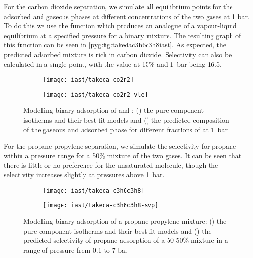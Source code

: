 For the carbon dioxide separation, we simulate all equilibrium 
points for the adsorbed and gaseous phases at different concentrations 
of the two gases at 1 bar. To do this we use the 
function which produces an analogue of a vapour-liquid equilibrium at 
a specified pressure for a binary mixture. The resulting graph of this
function can be seen in \autoref{pyg:fig:takedac3h6c3h8iast}.
As expected, the predicted adsorbed mixture is rich in carbon dioxide.
Selectivity can also be calculated in a single point, with the value at 
15\%  and \SI{1}{bar} being 16.5. 

\begin{figure}[htb]

    \centering
    \begin{subfigure}[b]{.5\textwidth}
        \centering
        \texttt{[image: iast/takeda-co2n2]}
        \caption{}%
        \label{pyg:fig:takedaco2n2iso}
    \end{subfigure}%
    \begin{subfigure}[b]{.5\textwidth}
        \centering
        \texttt{[image: iast/takeda-co2n2-vle]}
        \caption{}%
        \label{pyg:fig:takedaco2n2iast}
    \end{subfigure}
    \caption{
    Modelling binary adsorption of  and : 
    (\protect{}) the pure component
    isotherms and their best fit models and 
    (\protect{}) 
    the predicted composition of the gaseous
    and adsorbed phase for different fractions of 
     at \SI{1}{\bar}
    }%
    \label{pyg:fig:takedaco2n2}

\end{figure}

For the propane-propylene separation, we simulate the selectivity for
propane within a pressure range for a 50\% mixture of the two gases. 
It can be seen that there is little or no preference for the 
unsaturated molecule, though the selectivity increases slightly at 
pressures above \SI{1}{\bar}.

\begin{figure}[htb]

    \centering
    \begin{subfigure}[b]{.45\textwidth}
        \texttt{[image: iast/takeda-c3h6c3h8]}
        \caption{}%
        \label{pyg:fig:takedac3h6c3h8iso}
    \end{subfigure}
    \begin{subfigure}[b]{.45\textwidth}
        \texttt{[image: iast/takeda-c3h6c3h8-svp]}
        \caption{}%
        \label{pyg:fig:takedac3h6c3h8iast}
    \end{subfigure}
    \caption{%
    Modelling binary adsorption of a propane-propylene mixture: 
    (\protect{}) the pure-component
    isotherms and their best fit models and 
    (\protect{})
    the predicted selectivity of propane adsorption 
    of a 50-50\% mixture in a range of pressure from 0.1 to 7 bar}%
    \label{pyg:fig:takedac3h6c3h8}

\end{figure}